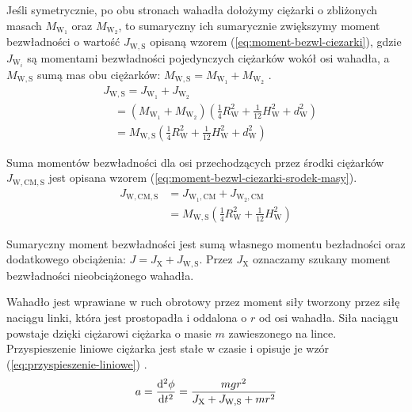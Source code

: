 \documentclass[twocolumn, a4paper, polish, 10pt]{article}
\newcommand{\JX}{\ensuremath{ J_{\mathrm{X}} }}
\newcommand{\JWS}{\ensuremath{ J_{\mathrm{W,S}} }}
\newcommand{\JwCmS}{\ensuremath{ J_{\mathrm{W,CM,S}} }}
\newcommand{\MWS}{\ensuremath{ M_{\mathrm{W,S}} }}
\begin{document}
Jeśli symetrycznie, po obu stronach wahadła dołożymy ciężarki o zbliżonych masach $M_\mathrm{W_1}$ oraz $M_\mathrm{W_2}$, to sumaryczny ich sumarycznie zwiększymy moment bezwładności o wartość $\JWS$ opisaną wzorem (\ref{eq:moment-bezwl-ciezarki}), gdzie $J_{\mathrm{W}_i}$ są momentami bezwładności pojedynczych ciężarków wokół osi wahadła, a $\MWS$ sumą mas obu ciężarków:
$\MWS = M_\mathrm{W_1} + M_\mathrm{W_2}$ \cite{pracownia-fizyczna-m7}.
\begin{equation}
\begin{split}
    &\JWS = J_{\mathrm{W_1}} + J_{\mathrm{W_2}} \\
    &\quad = \left(
        M_\mathrm{W_1} + M_\mathrm{W_2}
    \right) \left(
        \frac{1}{4} R_\mathrm{W}^2 + \frac{1}{12} H_\mathrm{W}^2 + d_\mathrm{W}^2
    \right) \\
    &\quad = \MWS \left(
        \frac{1}{4} R_\mathrm{W}^2 + \frac{1}{12} H_\mathrm{W}^2 + d_\mathrm{W}^2
    \right)
\label{eq:moment-bezwl-ciezarki}
\end{split}
\end{equation}

Suma momentów bezwładności dla osi przechodzących przez środki ciężarków $\JwCmS$ jest opisana wzorem (\ref{eq:moment-bezwl-ciezarki-srodek-masy}).
\begin{equation}
\begin{split}
    \JwCmS &= J_{\mathrm{W_1,CM}} + J_{\mathrm{W_2,CM}} \\
    &= \MWS \left(
        \frac{1}{4} R_\mathrm{W}^2 + \frac{1}{12} H_\mathrm{W}^2
    \right)
\label{eq:moment-bezwl-ciezarki-srodek-masy}
\end{split}
\end{equation}

Sumaryczny moment bezwładności jest sumą własnego momentu bezładności oraz dodatkowego obciążenia:
$J = \JX + \JWS$.
Przez $\JX$ oznaczamy szukany moment bezwładności nieobciążonego wahadła.

Wahadło jest wprawiane w ruch obrotowy przez moment siły tworzony przez siłę naciągu linki, która jest prostopadła i oddalona o $r$ od osi wahadła. Siła naciągu powstaje dzięki ciężarowi ciężarka o masie $m$ zawieszonego na lince. Przyspieszenie liniowe ciężarka jest stałe w czasie i opisuje je wzór (\ref{eq:przyspieszenie-liniowe}) \cite{pracownia-fizyczna-m7}.
\begin{equation}
\begin{split}
    a = \dv[2]{\phi}{t} = \frac{mgr^2}{\JX + \JWS + mr^2}
\label{eq:przyspieszenie-liniowe}
\end{split}
\end{equation}
\end{document}
